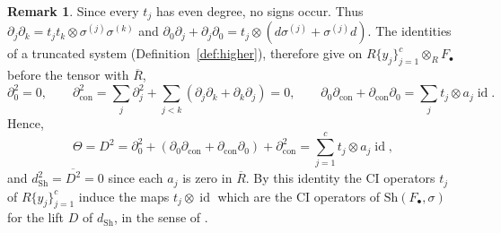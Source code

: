 \documentclass[12pt]{amsart}
\theoremstyle{plain}
\theoremstyle{definition}
\newtheorem{remark}[theorem]{Remark}
\newcommand{\dcon}{\partial_{\mathrm{con}}}
\newcommand{\F}{ {F_\bullet} }
\newcommand{\Rbar}{\overline{R}}
\newcommand{\id}{\operatorname{id}}
\newcommand{\Sh}{\mathrm{Sh}}
\begin{document}
\begin{remark}\label{rem:piecessquare}
    Since every $t_j$ has even degree, no signs occur. Thus $\partial_j \partial_k = t_j t_k \otimes \sigma^{(j)} \sigma^{(k)}$ and $\partial_0 \partial_j + \partial_j \partial_0 = t_j \otimes (d\sigma^{(j)} + \sigma^{(j)} d)$. The identities of a truncated system (Definition~\ref{def:higher}), therefore give on $R\{y_j\}_{j=1}^{c} \otimes_R \F$ before the tensor with $\Rbar$,
    \[
        \partial_0^2 = 0, \qquad \dcon^2 = \sum_{j} \partial_j^2 + \sum_{j < k} (\partial_j \partial_k + \partial_k \partial_j) = 0, \qquad \partial_0 \dcon + \dcon \partial_0 = \sum_j t_j \otimes a_j \id.
    \]
    Hence,
    \[
        \Theta = D^2 = \partial_0^2 + (\partial_0 \dcon + \dcon \partial_0) + \dcon^2 = \sum_{j=1}^{c} t_j \otimes a_j \id ,
    \]
    and $d_{\Sh}^2 = \overline{D^2} = 0$ since each $a_j$ is zero in $\Rbar$.
    By this identity the CI operators $t_j$ of $R\{y_j\}_{j=1}^c$ induce the maps $t_j \otimes \id$ which are the CI operators of $\Sh(\F, \sigma)$ for the lift $D$ of $d_{\Sh}$, in the sense of \cite[Construction~4.1.1]{EisenbudPeeva}.
\end{remark}
\end{document}
